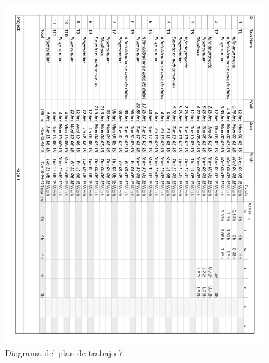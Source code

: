\begin{figure}[!htp]
	\centering
	\includegraphics[page=7, scale=.8]{fig/real_work_plan_diagram}
	\caption{Diagrama del plan de trabajo 7}
\end{figure}

